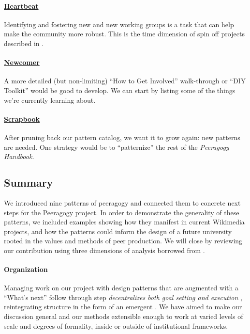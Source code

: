 \begin{refsection}
\paragraph{\hyperref[sec:Heartbeat]{Heartbeat}} Identifying and fostering new  and new working groups is a task that can help make the community more robust.  This is the time dimension of spin off projects described in .

\paragraph{\hyperref[sec:Newcomer]{Newcomer}} A more detailed (but non-limiting) ``How to Get Involved'' walk-through or ``DIY Toolkit'' would be good to develop. We can start by listing some of the things we're currently learning about.

\paragraph{\hyperref[sec:Scrapbook]{Scrapbook}} 
After pruning back our pattern catalog, we want it to grow again: new patterns are needed.
One strategy would be to ``patternize'' the rest of the \emph{Peeragogy Handbook.}

\subsection*{Summary}

We introduced nine patterns of peeragogy and connected them to
concrete next steps for the Peeragogy project.  In order to
demonstrate the generality of these patterns, we included examples
showing how they manifest in current Wikimedia projects, and 
how the patterns could inform the design of a future university rooted in the
values and methods of peer production.
%
We will close by reviewing our contribution using
three dimensions of analysis borrowed from \cite{benkler2015peer}.

\paragraph{Organization} 
Managing work on our project with design patterns that are augmented with
a ``What's next'' follow through step \emph{decentralizes both goal setting
  and execution} \cite{benkler2015peer}, reintegrating structure in
the form of an emergent .  We have aimed to make
our discussion general and our methods extensible enough to work at
varied levels of scale and degrees of formality, inside or outside of
institutional frameworks.


\end{refsection}
